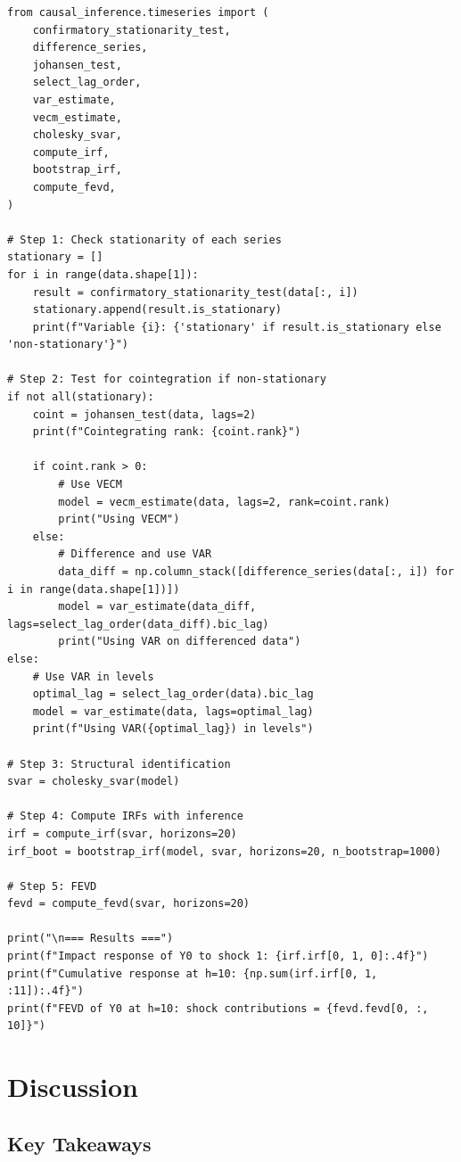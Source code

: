 \begin{verbatim}
from causal_inference.timeseries import (
    confirmatory_stationarity_test,
    difference_series,
    johansen_test,
    select_lag_order,
    var_estimate,
    vecm_estimate,
    cholesky_svar,
    compute_irf,
    bootstrap_irf,
    compute_fevd,
)

# Step 1: Check stationarity of each series
stationary = []
for i in range(data.shape[1]):
    result = confirmatory_stationarity_test(data[:, i])
    stationary.append(result.is_stationary)
    print(f"Variable {i}: {'stationary' if result.is_stationary else 'non-stationary'}")

# Step 2: Test for cointegration if non-stationary
if not all(stationary):
    coint = johansen_test(data, lags=2)
    print(f"Cointegrating rank: {coint.rank}")

    if coint.rank > 0:
        # Use VECM
        model = vecm_estimate(data, lags=2, rank=coint.rank)
        print("Using VECM")
    else:
        # Difference and use VAR
        data_diff = np.column_stack([difference_series(data[:, i]) for i in range(data.shape[1])])
        model = var_estimate(data_diff, lags=select_lag_order(data_diff).bic_lag)
        print("Using VAR on differenced data")
else:
    # Use VAR in levels
    optimal_lag = select_lag_order(data).bic_lag
    model = var_estimate(data, lags=optimal_lag)
    print(f"Using VAR({optimal_lag}) in levels")

# Step 3: Structural identification
svar = cholesky_svar(model)

# Step 4: Compute IRFs with inference
irf = compute_irf(svar, horizons=20)
irf_boot = bootstrap_irf(model, svar, horizons=20, n_bootstrap=1000)

# Step 5: FEVD
fevd = compute_fevd(svar, horizons=20)

print("\n=== Results ===")
print(f"Impact response of Y0 to shock 1: {irf.irf[0, 1, 0]:.4f}")
print(f"Cumulative response at h=10: {np.sum(irf.irf[0, 1, :11]):.4f}")
print(f"FEVD of Y0 at h=10: shock contributions = {fevd.fevd[0, :, 10]}")
\end{verbatim}


\section{Discussion}

\subsection{Key Takeaways}

